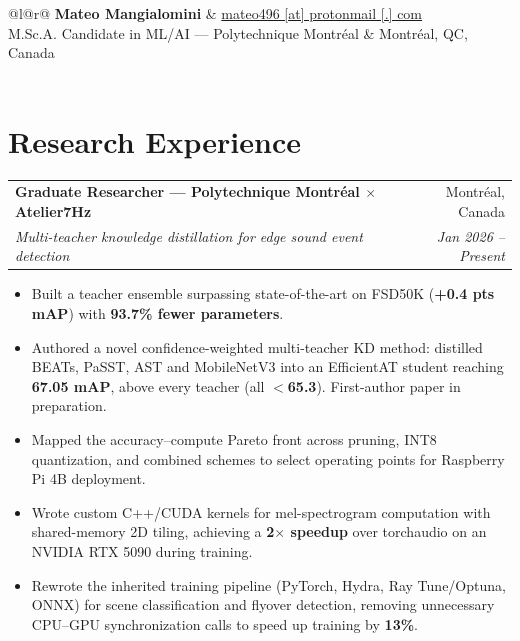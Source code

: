 \documentclass[letterpaper,10pt]{article}
\begin{document}
\noindent
\begin{tabular*}{\textwidth}{@{}l@{\extracolsep{\fill}}r@{}}
  \textbf{\Large Mateo Mangialomini} &
    \href{mailto:mateo496@protonmail.com}{mateo496 [at] protonmail [.] com} \\
  {\large M.Sc.A. Candidate in ML/AI --- Polytechnique Montréal} &
    Montréal, QC, Canada \\
   \\
\end{tabular*}
\vspace{4pt}

\newcommand{\entry}[4]{%
  \noindent
  \begin{tabular*}{\textwidth}{@{}l@{\extracolsep{\fill}}r@{}}
    \textbf{#1} & #2 \\[-1pt]
    \textit{\small #3} & \textit{\small #4} \\
  \end{tabular*}\par}
\newenvironment{bullets}
  {\begin{itemize}[leftmargin=12pt, itemsep=1pt, topsep=0pt, parsep=0pt, label={--}]\small}
  {\end{itemize}}


\section{Research Experience}
\entry{Graduate Researcher --- Polytechnique Montréal $\times$ Atelier7Hz}{Montréal, Canada}
  {Multi-teacher knowledge distillation for edge sound event detection}{Jan 2026 -- Present}
\begin{bullets}
\item Built a teacher ensemble surpassing state-of-the-art on FSD50K (\textbf{+0.4 pts mAP}) with \textbf{93.7\% fewer parameters}.
\item Authored a novel confidence-weighted multi-teacher KD method: distilled BEATs, PaSST, AST and MobileNetV3 into an EfficientAT student reaching \textbf{67.05 mAP}, above every teacher (all $<$\textbf{65.3}). First-author paper in preparation.
\item Mapped the accuracy--compute Pareto front across pruning, INT8 quantization, and combined schemes to select operating points for Raspberry Pi 4B deployment.
\item Wrote custom C++/CUDA kernels for mel-spectrogram computation with shared-memory 2D tiling, achieving a \textbf{2$\times$ speedup} over torchaudio on an NVIDIA RTX 5090 during training.
\item Rewrote the inherited training pipeline (PyTorch, Hydra, Ray Tune/Optuna, ONNX) for scene classification and flyover detection, removing unnecessary CPU--GPU synchronization calls to speed up training by \textbf{13\%}.
\end{bullets}
\vspace{3pt}
\end{document}
